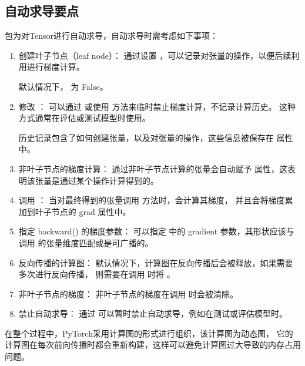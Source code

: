 \subsection{自动求导要点}
\label{subsec:Pytorch的自动求导要点}
包为对Tensor进行自动求导，自动求导时需考虑如下事项：
\begin{enumerate}[label=\arabic*)]
    \item 创建叶子节点（leaf node）：
    通过设置 ，可以记录对张量的操作，以便后续利用进行梯度计算。

    默认情况下， 为 False。

    \item 修改 ：
    可以通过  或使用  方法来临时禁止梯度计算，不记录计算历史。
    这种方式通常在评估或测试模型时使用。

    历史记录包含了如何创建张量，以及对张量的操作，这些信息被保存在  属性中。
    
    \item 非叶子节点的梯度计算：
    通过非叶子节点计算的张量会自动赋予  属性，这表明该张量是通过某个操作计算得到的。
    
    \item 调用 ：
    当对最终得到的张量调用  方法时，会计算其梯度，
    并且会将梯度累加到叶子节点的 grad 属性中。
    
    \item 指定 backward() 的梯度参数：
    可以指定  中的 gradient 参数，其形状应该与调用  的张量维度匹配或是可广播的。
    
    \item 反向传播的计算图：
    默认情况下，计算图在反向传播后会被释放，如果需要多次进行反向传播，
    则需要在调用  时将 。
    
    \item 非叶子节点的梯度：
    非叶子节点的梯度在调用  时会被清除。
    
    \item 禁止自动求导：
    通过  可以暂时禁止自动求导，例如在测试或评估模型时。
\end{enumerate}

在整个过程中，PyTorch采用计算图的形式进行组织，该计算图为动态图，
它的计算图在每次前向传播时都会重新构建，这样可以避免计算图过大导致的内存占用问题。

